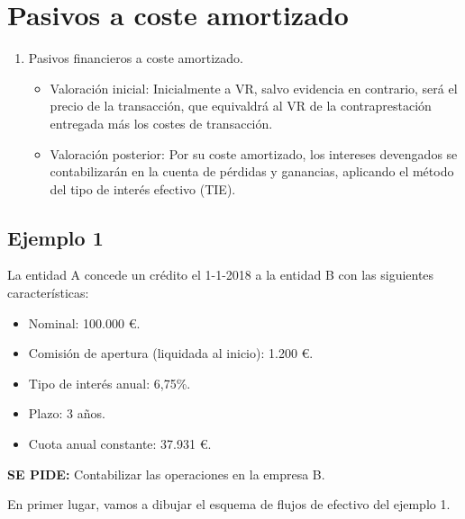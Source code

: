 \section{Pasivos a coste amortizado}

\begin{enumerate}
    \item Pasivos financieros a coste amortizado.
    \begin{itemize}
        \item Valoración inicial: Inicialmente a VR, salvo evidencia en contrario, será el precio de la transacción, que equivaldrá al VR de la contraprestación entregada más los costes de transacción.
        \item Valoración posterior: Por su coste amortizado, los intereses devengados se contabilizarán en la cuenta de pérdidas y ganancias, aplicando el método del tipo de interés efectivo (TIE).
    \end{itemize}
\end{enumerate}

\subsection*{Ejemplo 1}

La entidad A concede un crédito el 1-1-2018 a la entidad B con las siguientes características:
\begin{itemize}
    \item Nominal: 100.000 €.
    \item Comisión de apertura (liquidada al inicio): 1.200 €.
    \item Tipo de interés anual: 6,75\%.
    \item Plazo: 3 años.
    \item Cuota anual constante: 37.931 €.
\end{itemize}

\textbf{SE PIDE:} Contabilizar las operaciones en la empresa B.


En primer lugar, vamos a dibujar el esquema de flujos de efectivo del ejemplo 1.



